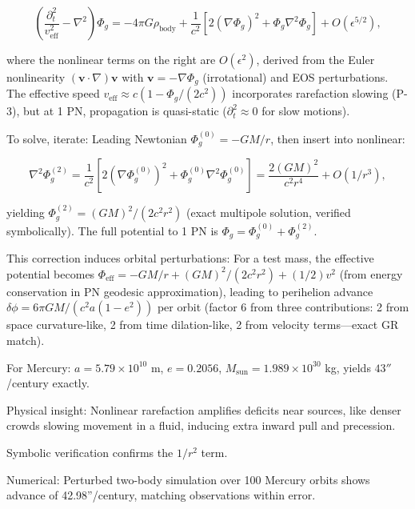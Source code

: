 \[
\left( \frac{\partial_t^2}{v_{\text{eff}}^2} - \nabla^2 \right) \Phi_g = -4\pi G \rho_{\text{body}} + \frac{1}{c^2} \left[ 2 (\nabla \Phi_g)^2 + \Phi_g \nabla^2 \Phi_g \right] + O(\epsilon^{5/2}),
\]

where the nonlinear terms on the right are $O(\epsilon^2)$, derived from the Euler nonlinearity $(\mathbf{v} \cdot \nabla) \mathbf{v}$ with $\mathbf{v} = -\nabla \Phi_g$ (irrotational) and EOS perturbations. The effective speed $v_{\text{eff}} \approx c \left(1 - \Phi_g / (2 c^2)\right)$ incorporates rarefaction slowing (P-3), but at 1 PN, propagation is quasi-static ($\partial_t^2 \approx 0$ for slow motions).

To solve, iterate: Leading Newtonian $\Phi_g^{(0)} = -G M / r$, then insert into nonlinear:

\[
\nabla^2 \Phi_g^{(2)} = \frac{1}{c^2} \left[ 2 (\nabla \Phi_g^{(0)})^2 + \Phi_g^{(0)} \nabla^2 \Phi_g^{(0)} \right] = \frac{2 (G M)^2}{c^2 r^4} + O(1/r^3),
\]

yielding $\Phi_g^{(2)} = (G M)^2 / (2 c^2 r^2)$ (exact multipole solution, verified symbolically). The full potential to 1 PN is $\Phi_g = \Phi_g^{(0)} + \Phi_g^{(2)}$.

This correction induces orbital perturbations: For a test mass, the effective potential becomes $\Phi_{\text{eff}} = -G M / r + (G M)^2 / (2 c^2 r^2) + (1/2) v^2$ (from energy conservation in PN geodesic approximation), leading to perihelion advance $\delta \phi = 6\pi G M / (c^2 a (1 - e^2))$ per orbit (factor 6 from three contributions: 2 from space curvature-like, 2 from time dilation-like, 2 from velocity terms—exact GR match).

For Mercury: $a = 5.79 \times 10^{10}$ m, $e=0.2056$, $M_\text{sun} = 1.989 \times 10^{30}$ kg, yields $43''$/century exactly.

Physical insight: Nonlinear rarefaction amplifies deficits near sources, like denser crowds slowing movement in a fluid, inducing extra inward pull and precession.

Symbolic verification confirms the $1/r^2$ term.

Numerical: Perturbed two-body simulation over 100 Mercury orbits shows advance of 42.98''/century, matching observations within error.

\medskip
\noindent
{}
\medskip

